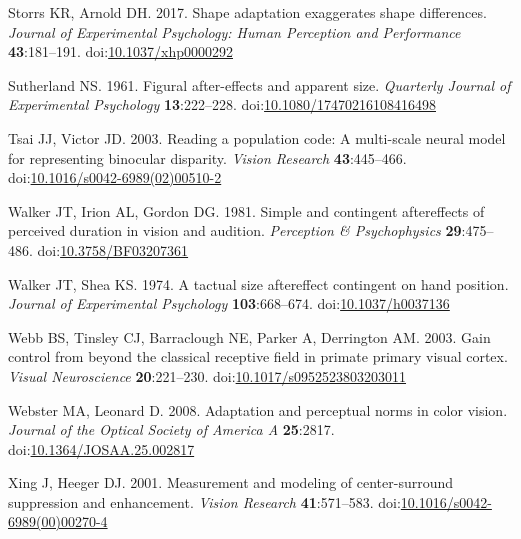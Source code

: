 \documentclass[
]{article}
\newlength{\cslhangindent}
\newlength{\cslentryspacingunit} %
\newenvironment{CSLReferences}[2] %
 {%
  \setlength{\parindent}{0pt}
  \ifodd #1
  \let\oldpar\par
  \def\par{\hangindent=\cslhangindent\oldpar}
  \fi
  \setlength{\parskip}{#2\cslentryspacingunit}
 }%
 {}
\begin{document}
\begin{CSLReferences}{1}{0}
\leavevmode{}%
Storrs KR, Arnold DH. 2017. Shape adaptation exaggerates shape differences. \emph{Journal of Experimental Psychology: Human Perception and Performance} \textbf{43}:181--191. doi:\href{https://doi.org/10.1037/xhp0000292}{10.1037/xhp0000292}

\leavevmode{}%
Sutherland NS. 1961. Figural after-effects and apparent size. \emph{Quarterly Journal of Experimental Psychology} \textbf{13}:222--228. doi:\href{https://doi.org/10.1080/17470216108416498}{10.1080/17470216108416498}

\leavevmode{}%
Tsai JJ, Victor JD. 2003. Reading a population code: A multi-scale neural model for representing binocular disparity. \emph{Vision Research} \textbf{43}:445--466. doi:\href{https://doi.org/10.1016/s0042-6989(02)00510-2}{10.1016/s0042-6989(02)00510-2}

\leavevmode{}%
Walker JT, Irion AL, Gordon DG. 1981. Simple and contingent aftereffects of perceived duration in vision and audition. \emph{Perception \& Psychophysics} \textbf{29}:475--486. doi:\href{https://doi.org/10.3758/BF03207361}{10.3758/BF03207361}

\leavevmode{}%
Walker JT, Shea KS. 1974. A tactual size aftereffect contingent on hand position. \emph{Journal of Experimental Psychology} \textbf{103}:668--674. doi:\href{https://doi.org/10.1037/h0037136}{10.1037/h0037136}

\leavevmode{}%
Webb BS, Tinsley CJ, Barraclough NE, Parker A, Derrington AM. 2003. Gain control from beyond the classical receptive field in primate primary visual cortex. \emph{Visual Neuroscience} \textbf{20}:221--230. doi:\href{https://doi.org/10.1017/s0952523803203011}{10.1017/s0952523803203011}

\leavevmode{}%
Webster MA, Leonard D. 2008. Adaptation and perceptual norms in color vision. \emph{Journal of the Optical Society of America A} \textbf{25}:2817. doi:\href{https://doi.org/10.1364/JOSAA.25.002817}{10.1364/JOSAA.25.002817}

\leavevmode{}%
Xing J, Heeger DJ. 2001. Measurement and modeling of center-surround suppression and enhancement. \emph{Vision Research} \textbf{41}:571--583. doi:\href{https://doi.org/10.1016/s0042-6989(00)00270-4}{10.1016/s0042-6989(00)00270-4}


\end{CSLReferences}
\end{document}
